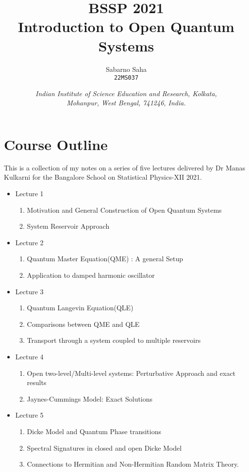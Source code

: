 \documentclass{scrartcl}
\title{
        \Large\textsc{BSSP 2021} \\
        \vspace{10pt}
        \Huge \textbf{Introduction to Open Quantum Systems} \\
}
\author{Sabarno Saha \\ \texttt{22MS037}}
\date{\normalsize
        \textit{Indian Institute of Science Education and Research, Kolkata, \\
        Mohanpur, West Bengal, 741246, India.}
}
\newcommand{\1}{\mathbbm{1}}
\begin{document}
\maketitle
\tableofcontents
\pagebreak{}
\section*{Course Outline}
This is a collection of my notes on a series of five lectures delivered by Dr Manas Kulkarni for the Bangalore School on Statistical Physics-XII 2021.
\begin{itemize}
    \item Lecture 1
    \begin{enumerate}
        \item Motivation and General Construction of Open Quantum Systems
        \item System Reservoir Approach
    \end{enumerate}
    \item Lecture 2
    \begin{enumerate}
        \item Quantum Master Equation(QME) : A general Setup
        \item Application to damped harmonic oscillator
    \end{enumerate}
    \item Lecture 3
    \begin{enumerate}
        \item Quantum Langevin Equation(QLE)
        \item Comparisons between QME and QLE
        \item Transport through a system coupled to multiple reservoirs
    \end{enumerate}
    \item Lecture 4
    \begin{enumerate}
        \item Open two-level/Multi-level systems: Perturbative Approach and exact results
        \item Jaynes-Cummings Model: Exact Solutions
    \end{enumerate}
    \item Lecture 5
    \begin{enumerate}
        \item Dicke Model and Quantum Phase transitions
        \item Spectral Signatures in closed and open Dicke Model
    \item Connections to Hermitian and Non-Hermitian Random Matrix Theory.
    \end{enumerate}
\end{itemize}
\end{document}
